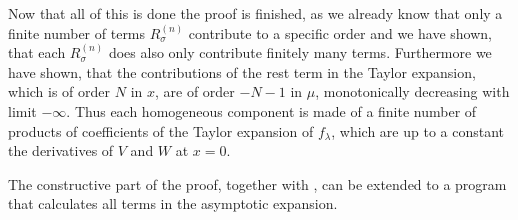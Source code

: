 \begin{MainTheorem}
\begin{Proof}

    Now that all of this is done the proof is finished, as we already know that
    only a finite number of terms $R^{(n)}_\sigma$ contribute to a specific
    order and we have shown, that each $R^{(n)}_\sigma$ does also only
    contribute finitely many terms. Furthermore we have shown, that the
    contributions of the rest term in the Taylor expansion, which is of order
    $N$ in $x$, are of order $-N-1$ in $\mu$, monotonically decreasing with
    limit $-\infty$. Thus each homogeneous component is made of a finite number
    of products of coefficients of the Taylor expansion of $f_\lambda$, which
    are up to a constant the derivatives of $V$ and $W$ at $x=0$.
  \end{Proof}
\end{MainTheorem}

The constructive part of the proof, together with , can be
extended to a program that calculates all terms in the asymptotic expansion.
